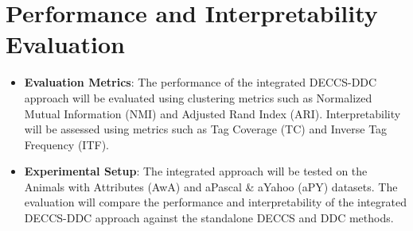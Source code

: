\section{Performance and Interpretability Evaluation}
\begin{itemize}
    \item \textbf{Evaluation Metrics}: The performance of the integrated DECCS-DDC approach will be evaluated using clustering metrics such as Normalized Mutual Information (NMI) and Adjusted Rand Index (ARI). Interpretability will be assessed using metrics such as Tag Coverage (TC) and Inverse Tag Frequency (ITF).
    \item \textbf{Experimental Setup}: The integrated approach will be tested on the Animals with Attributes (AwA) and aPascal \& aYahoo (aPY) datasets. The evaluation will compare the performance and interpretability of the integrated DECCS-DDC approach against the standalone DECCS and DDC methods.
\end{itemize}
